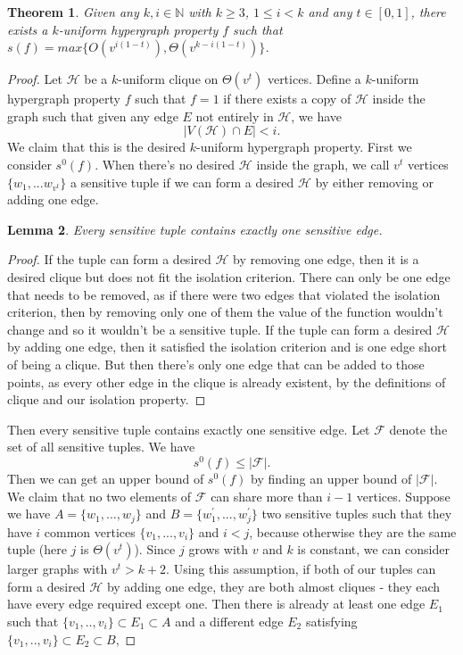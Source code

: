 \documentclass[psamsfonts]{amsart}
\newtheorem{theorem}{Theorem}[section]
\newtheorem{lem}[theorem]{Lemma}
\theoremstyle{definition}
\theoremstyle{remark}
\numberwithin{equation}{section}
\begin{document}
	\begin{theorem}
		Given any $k,i \in \mathbb{N}$ with $k\geq 3$, $1 \leq i < k$ and any $t \in [0,1]$, there exists a $k$-uniform hypergraph property $f$ such that $s(f) = max\{O(v^{i(1-t)}), \Theta(v^{k-i(1-t)})\}$.
	\end{theorem}
	\begin{proof}
		Let $\mathcal{H}$ be a $k$-uniform clique on $\Theta(v^t)$ vertices.  Define a $k$-uniform hypergraph property $f$ such that $f=1$ if there exists a copy of $\mathcal{H}$ inside the graph such that given any edge $E$ not entirely in $\mathcal{H}$, we have
		\begin{equation}
			|V(\mathcal{H}) \cap E| < i. \nonumber
		\end{equation}
		\indent We claim that this is the desired $k$-uniform hypergraph property. First we consider $s^0(f)$. When there's no desired $\mathcal{H}$ inside the graph, we call $v^t$ vertices $\{w_1,...w_{v^t}\}$ a sensitive tuple if we can form a desired $\mathcal{H}$ by either removing or adding one edge. 
		\begin{lem}
			Every sensitive tuple contains exactly one sensitive edge.
		\end{lem}
		\begin{proof}
			If the tuple can form a desired $\mathcal{H}$ by removing one edge, then it is a desired clique but does not fit the isolation criterion. There can only be one edge that needs to be removed, as if there were two edges that violated the isolation criterion, then by removing only one of them the value of the function wouldn't change and so it wouldn't be a sensitive tuple.
If the tuple can form a desired $\mathcal{H}$ by adding one edge, then it satisfied the isolation criterion and is one edge short of being a clique. But then there's only one edge that can be added to those points, as every other edge in the clique is already existent, by the definitions of clique and our isolation property.
		\end{proof}
		 Then every sensitive tuple contains exactly one sensitive edge. Let $\mathcal{F}$ denote the set of all sensitive tuples.  We have
		\begin{equation}
			s^0(f) \leq |\mathcal{F}|. \nonumber
		\end{equation}
		Then we can get an upper bound of $s^0(f)$ by finding an upper bound of $|\mathcal{F}|$. We claim that no two elements of $\mathcal{F}$ can share more than $i-1$ vertices. Suppose we have $A=\{w_1,...,w_{j}\}$ and $B=\{w_1^\prime,...,w_{j}^\prime\}$ two sensitive tuples such that they have $i$ common vertices $\{v_1,...,v_i\}$ and $i<j$, because otherwise they are the same tuple (here $j$ is $\Theta(v^t)$).  Since $j$ grows with $v$ and $k$ is constant, we can consider larger graphs with $v^{t} > k + 2$.  Using this assumption, if both of our tuples can form a desired $\mathcal{H}$ by adding one edge, they are both almost cliques - they each have every edge required except one.  Then there is already at least one edge $E_{1}$ such that $\{v_1,..,v_i\} \subset E_{1} \subset A$ and a different edge $E_{2}$ satisfying $\{v_1,..,v_i\} \subset E_{2} \subset B$, 

\end{proof}
\end{document}
